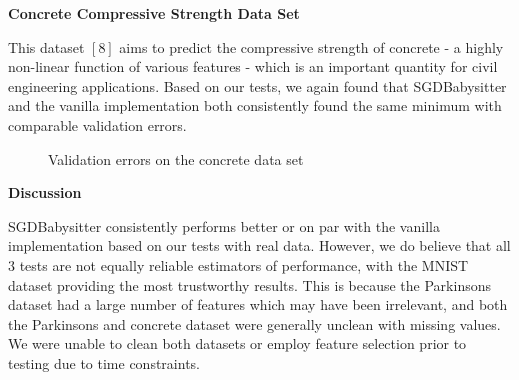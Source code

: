 \documentclass{article}
\begin{document}
\textbf{Concrete Compressive Strength Data Set}
\par This dataset $ [8] $ aims to predict the compressive strength of concrete -  a highly non-linear function of various features - which is an important quantity for civil engineering applications. Based on our tests, we again found that SGDBabysitter and the vanilla implementation both consistently found the same minimum with comparable validation errors. 
\begin{figure}[H]
	\centering
	\quad
	\caption{Validation errors on the concrete data set}%
	\label{Concrete}%
\end{figure}

\textbf{Discussion}
\par SGDBabysitter consistently performs better or on par with the vanilla implementation based on our tests with real data. However, we do believe that all $ 3 $ tests are not equally reliable estimators of performance, with the MNIST dataset providing the most trustworthy results. This is because the Parkinsons dataset had a large number of features which may have been irrelevant, and both the Parkinsons and concrete dataset were generally unclean with missing values. We were unable to clean both datasets or employ feature selection prior to testing due to time constraints. 
\end{document}
